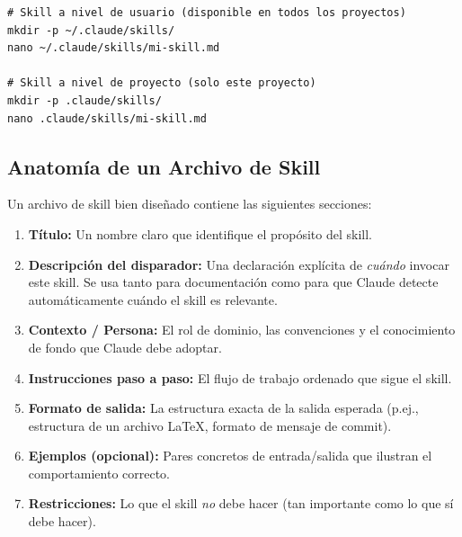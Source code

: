 \documentclass[11pt,letterpaper]{article}
\begin{document}
\begin{lstlisting}[style=BashStyle, caption={Creación de un archivo de skill}]
# Skill a nivel de usuario (disponible en todos los proyectos)
mkdir -p ~/.claude/skills/
nano ~/.claude/skills/mi-skill.md

# Skill a nivel de proyecto (solo este proyecto)
mkdir -p .claude/skills/
nano .claude/skills/mi-skill.md
\end{lstlisting}

\subsection{Anatomía de un Archivo de Skill}

Un archivo de skill bien diseñado contiene las siguientes secciones:

\begin{enumerate}[leftmargin=*]
    \item \textbf{Título:} Un nombre claro que identifique el propósito del skill.
    \item \textbf{Descripción del disparador:} Una declaración explícita de \emph{cuándo} invocar este skill. Se usa tanto para documentación como para que Claude detecte automáticamente cuándo el skill es relevante.
    \item \textbf{Contexto / Persona:} El rol de dominio, las convenciones y el conocimiento de fondo que Claude debe adoptar.
    \item \textbf{Instrucciones paso a paso:} El flujo de trabajo ordenado que sigue el skill.
    \item \textbf{Formato de salida:} La estructura exacta de la salida esperada (p.ej., estructura de un archivo LaTeX, formato de mensaje de commit).
    \item \textbf{Ejemplos (opcional):} Pares concretos de entrada/salida que ilustran el comportamiento correcto.
    \item \textbf{Restricciones:} Lo que el skill \emph{no} debe hacer (tan importante como lo que sí debe hacer).
\end{enumerate}
\end{document}
